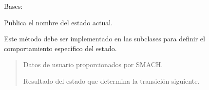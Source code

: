 \documentclass[a4paper,10pt,spanish]{sphinxmanual}
\begin{document}

\begin{fulllineitems}
\label{\detokenize{squad_state_manager:squad_state_manager.EstadoReposo}}
\pysigstartsignatures
{}
\pysigstopsignatures
\sphinxAtStartPar
Bases: {\hyperref[\detokenize{squad_state_manager:squad_state_manager.BaseState}]{}}

\begin{fulllineitems}
\label{\detokenize{squad_state_manager:squad_state_manager.EstadoReposo.execute}}
\pysigstartsignatures
{}
\pysigstopsignatures
\sphinxAtStartPar
Publica el nombre del estado actual.

\sphinxAtStartPar
Este método debe ser implementado en las subclases para definir el comportamiento específico del estado.
\begin{quote}\begin{description}
\sphinxAtStartPar
{} \textendash{} Datos de usuario proporcionados por SMACH.

\sphinxAtStartPar
Resultado del estado que determina la transición siguiente.

\sphinxAtStartPar
{}

\end{description}\end{quote}

\end{fulllineitems}


\end{fulllineitems}

\end{document}
